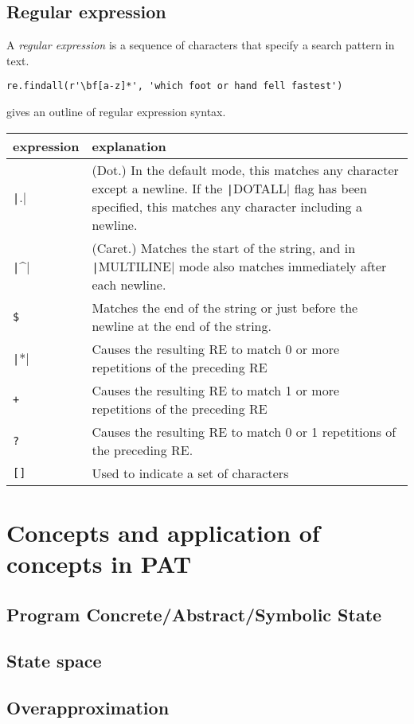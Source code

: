 \documentclass{article}
\begin{document}
\subsection{Regular expression}
A \emph{regular expression} is a sequence of characters that specify a search pattern
in text.
\begin{verbatim}
re.findall(r'\bf[a-z]*', 'which foot or hand fell fastest')
\end{verbatim}
 gives an outline of regular expression syntax.
\begin{table}[H]
\begin{tabular}{l p{10cm}}
expression & explanation\\\toprule
\texttt|.| & (Dot.) In the default mode, this matches any character except a newline. If the \texttt|DOTALL| flag has been specified, this matches any character including a newline.\\\cmidrule{2-2}
\texttt|^| & (Caret.) Matches the start of the string, and in \texttt|MULTILINE| mode also matches immediately after each newline.\\\cmidrule{2-2}
\texttt{\$} & Matches the end of the string or just before the newline at the end of the string.\\\cmidrule{2-2}
\texttt|*| & Causes the resulting RE to match 0 or more repetitions of the preceding RE\\\cmidrule{2-2}
\texttt{+} & Causes the resulting RE to match 1 or more repetitions of the preceding RE\\\cmidrule{2-2}
\texttt{?} & Causes the resulting RE to match 0 or 1 repetitions of the preceding RE.\\\cmidrule{2-2}
\texttt{[]} & Used to indicate a set of characters
\end{tabular}
\end{table} 
\section{Concepts and application of concepts in PAT} 
\subsection{Program Concrete/Abstract/Symbolic State} 
\subsection{State space} 
\subsection{Overapproximation} 
\end{document}
